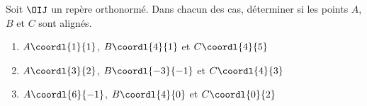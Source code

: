\begin{exo}
	Soit $\OIJ$ un repère orthonormé. Dans chacun des cas, déterminer si les points $A$, $B$ et $C$ sont alignés.
	\begin{enumerate}
		\item $A\coordl{1}{1}$, $B\coordl{4}{1}$ et $C\coordl{4}{5}$
		\item $A\coordl{3}{2}$, $B\coordl{-3}{-1}$ et $C\coordl{4}{3}$
		\item $A\coordl{6}{-1}$, $B\coordl{4}{0}$ et $C\coordl{0}{2}$
	\end{enumerate}
\end{exo}

